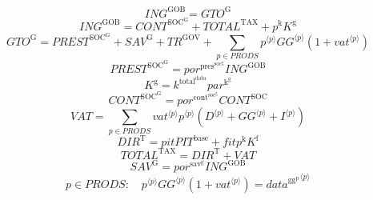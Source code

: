 \begin{equation}
{I\!N\!G}^{\mathrm{GOB}} = {G\!T\!O}^{\mathrm{G}}
\end{equation}
\begin{equation}
{I\!N\!G}^{\mathrm{GOB}} = {C\!O\!N\!T}^{\mathrm{SOC}^{\mathrm{G}}} + {T\!O\!T\!A\!L}^{\mathrm{TAX}} + {p^{\mathrm{k}}} {K^{\mathrm{g}}}
\end{equation}
\begin{equation}
{G\!T\!O}^{\mathrm{G}} = {P\!R\!E\!S\!T}^{\mathrm{SOC}^{\mathrm{G}}} + {S\!A\!V}^{\mathrm{G}} + {T\!R}^{\mathrm{GOV}} + \sum_{p\in {P\!R\!O\!D\!S}} {{p}^{\langle p\rangle}} {{{G\!G}}^{\langle p\rangle}} \left(1 + {{v\!a\!t}}^{\langle p\rangle}\right)
\end{equation}
\begin{equation}
{P\!R\!E\!S\!T}^{\mathrm{SOC}^{\mathrm{G}}} = {{p\!o\!r}^{\mathrm{pres}^{\mathrm{soc}^{\mathrm{g}}}}} {{I\!N\!G}^{\mathrm{GOB}}}
\end{equation}
\begin{equation}
K^{\mathrm{g}} = {k^{\mathrm{total}^{\mathrm{data}}}} {{p\!a\!r}^{\mathrm{k}^{\mathrm{g}}}}
\end{equation}
\begin{equation}
{C\!O\!N\!T}^{\mathrm{SOC}^{\mathrm{G}}} = {{p\!o\!r}^{\mathrm{cont}^{\mathrm{soc}^{\mathrm{g}}}}} {{C\!O\!N\!T}^{\mathrm{SOC}}}
\end{equation}
\begin{equation}
{V\!A\!T} = \sum_{p\in {P\!R\!O\!D\!S}} {{{v\!a\!t}}^{\langle p\rangle}} {{p}^{\langle p\rangle}} \left({D}^{\langle p\rangle} + {{G\!G}}^{\langle p\rangle} + {I}^{\langle p\rangle}\right)
\end{equation}
\begin{equation}
{D\!I\!R}^{\mathrm{T}} = {{p\!i\!t}} {{P\!I\!T}^{\mathrm{base}}} + {{f\!i\!t}} {p^{\mathrm{k}}} {K^{\mathrm{f}}}
\end{equation}
\begin{equation}
{T\!O\!T\!A\!L}^{\mathrm{TAX}} = {D\!I\!R}^{\mathrm{T}} + {V\!A\!T}
\end{equation}
\begin{equation}
{S\!A\!V}^{\mathrm{G}} = {{p\!o\!r}^{\mathrm{sav}^{\mathrm{g}}}} {{I\!N\!G}^{\mathrm{GOB}}}
\end{equation}
\begin{equation}
p\in {P\!R\!O\!D\!S}\colon\quad {{p}^{\langle p\rangle}} {{{G\!G}}^{\langle p\rangle}} \left(1 + {{v\!a\!t}}^{\langle p\rangle}\right) = {{d\!a\!t\!a}^{\mathrm{gg}^{\mathrm{p}}}}^{\langle p\rangle}
\end{equation}




